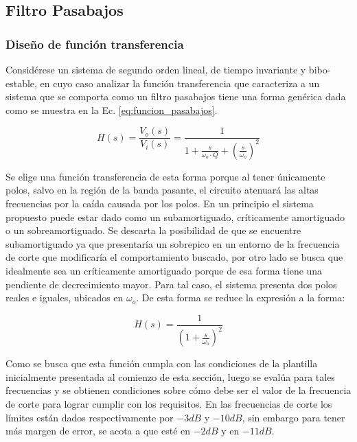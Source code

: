 \subsection{Filtro Pasabajos}

\subsubsection{Dise\~no de funci\'on transferencia}
Consid\'erese un sistema de segundo orden lineal, de tiempo invariante y bibo-estable, en cuyo caso analizar la funci\'on transferencia que caracteriza a un sistema
que se comporta como un filtro pasabajos tiene una forma gen\'erica dada como se muestra en la Ec. \ref{eq:funcion_pasabajos}.

\begin{equation}
    H(s) = \frac{V_o(s)}{V_i(s)} = \frac{1}{1 + \frac{s}{\omega_o \cdot Q} + \left( \frac{s}{\omega_o}\right)^{2}}
    \label{eq:funcion_pasabajos}
\end{equation}

Se elige una funci\'on transferencia de esta forma porque al tener \'unicamente polos, salvo en la regi\'on de la banda pasante, el circuito atenuar\'a las altas frecuencias por la ca\'ida causada por los polos. En un principio el sistema propuesto
puede estar dado como un subamortiguado, cr\'iticamente amortiguado o un sobreamortiguado. Se descarta la posibilidad de que se encuentre subamortiguado ya que presentar\'ia un sobrepico en un entorno de la frecuencia de corte
que modificar\'ia el comportamiento buscado, por otro lado se busca que idealmente sea un cr\'iticamente amortiguado porque de esa forma tiene una pendiente de decrecimiento mayor. Para tal caso, el sistema presenta dos polos reales e iguales, ubicados en $\omega_o$. De esta forma se reduce la expresi\'on a la forma:

\begin{equation}
    H(s) = \frac{1}{\left(1 + \frac{s}{\omega_o}\right)^{2}}
    \label{eq:funcion_pasabajos_ideal}
\end{equation}

Como se busca que esta funci\'on cumpla con las condiciones de la plantilla inicialmente presentada al comienzo de esta secci\'on, luego se eval\'ua para tales frecuencias
y se obtienen condiciones sobre c\'omo debe ser el valor de la frecuencia de corte para lograr cumplir con los requisitos. En las frecuencias de corte los l\'imites est\'an dados respectivamente por
$-3dB$ y $-10dB$, sin embargo para tener m\'as margen de error, se acota a que est\'e en $-2dB$ y en $-11dB$.

